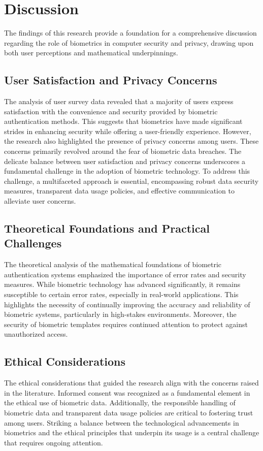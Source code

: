 \documentclass{IEEEtran}
\begin{document}
\section{Discussion}
The findings of this research provide a foundation for a comprehensive discussion regarding the role of biometrics in computer security and privacy, drawing upon both user perceptions and mathematical underpinnings.

\subsection{User Satisfaction and Privacy Concerns}
The analysis of user survey data revealed that a majority of users express satisfaction with the convenience and security provided by biometric authentication methods. This suggests that biometrics have made significant strides in enhancing security while offering a user-friendly experience. However, the research also highlighted the presence of privacy concerns among users. These concerns primarily revolved around the fear of biometric data breaches. The delicate balance between user satisfaction and privacy concerns underscores a fundamental challenge in the adoption of biometric technology. To address this challenge, a multifaceted approach is essential, encompassing robust data security measures, transparent data usage policies, and effective communication to alleviate user concerns.

\subsection{Theoretical Foundations and Practical Challenges}
The theoretical analysis of the mathematical foundations of biometric authentication systems emphasized the importance of error rates and security measures. While biometric technology has advanced significantly, it remains susceptible to certain error rates, especially in real-world applications. This highlights the necessity of continually improving the accuracy and reliability of biometric systems, particularly in high-stakes environments. Moreover, the security of biometric templates requires continued attention to protect against unauthorized access.

\subsection{Ethical Considerations}
The ethical considerations that guided the research align with the concerns raised in the literature. Informed consent was recognized as a fundamental element in the ethical use of biometric data. Additionally, the responsible handling of biometric data and transparent data usage policies are critical to fostering trust among users. Striking a balance between the technological advancements in biometrics and the ethical principles that underpin its usage is a central challenge that requires ongoing attention.
\end{document}
